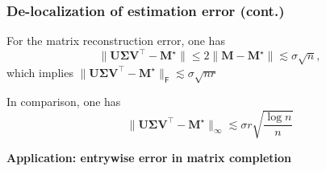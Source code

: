 \documentclass[compress,
mathserif,wide,%
]{beamer}
\begin{document}
\begin{frame}
	\frametitle{De-localization of estimation error (cont.)}
	For the matrix reconstruction error, one has 
	\[
	\| \bm{U}\bm{\Sigma}\bm{V}^{\top}-\bm{M}^{\star} \| \leq 2 \| \bm{M} - \bm{M}^\star \| \lesssim \sigma \sqrt{n}, 
	\]
	which implies $\| \bm{U}\bm{\Sigma}\bm{V}^{\top}-\bm{M}^{\star} \|_{\mathsf{F}} \lesssim \sigma \sqrt{nr}$
	
	\vfill
	In comparison, one has
	\begin{equation*}
	\|\bm{U}\bm{\Sigma}\bm{V}^{\top}-\bm{M}^{\star}\|_{\infty}\lesssim\sigma r\sqrt{\frac{ \log n}{n}}
\end{equation*}
	\end{frame}



\begin{frame}[plain]
\vfill
\centering
{\Large \bf Application: entrywise error in matrix completion}
\vfill
\end{frame}
\end{document}
